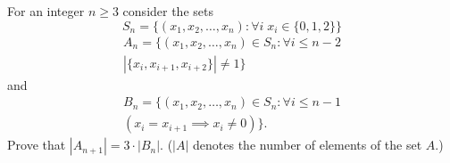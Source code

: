 \documentclass{article}
\begin{document}
\setlength{\parindent}{0pt}
For an integer $n\ge3$ consider the sets$$S_{n}=\{(x_{1},x_{2},\dots,x_{n}):\forall i\;x_{i}\in\{0,1,2\}\}$$
\begin{multline*}
A_{n}=\{(x_{1},x_{2},\dots,x_{n})\in S_{n}:\forall i\le n-2\\|\{x_{i},x_{i+1},x_{i+2}\}|\ne1\}
\end{multline*}
and
\begin{multline*}
B_{n}=\{(x_{1},x_{2},\dots,x_{n})\in S_{n}:\forall i\le n-1\\(x_{i}=x_{i+1}\implies x_{i}\ne0)\}.
\end{multline*}
Prove that $|A_{n+1}|=3\cdot|B_{n}|$.\newline
($|A|$ denotes the number of elements of the set $A$.)
\end{document}
